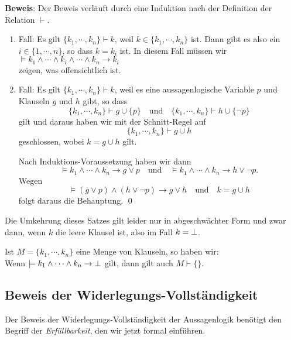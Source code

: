 \noindent
\textbf{Beweis}:  Der Beweis verl\"{a}uft durch eine Induktion nach der Definition der Relation $\vdash$. 
\begin{enumerate}
\item Fall: Es gilt $\{ k_1, \cdots, k_n \} \vdash k$, weil $k \in \{ k_1, \cdots, k_n \}$ ist.  
      Dann gibt es also ein $i \in \{1,\cdots,n\}$, so dass $k = k_i$ ist.  In diesem Fall
      m\"{u}ssen wir
      \\[0.2cm]
      \hspace*{1.3cm}
      $\models k_1 \wedge \cdots \wedge k_i \wedge \cdots \wedge k_n \rightarrow k_i$
      \\[0.2cm]
      zeigen, was offensichtlich ist.
\item Fall: Es gilt $\{ k_1, \cdots, k_n \} \vdash k$, weil es eine aussagenlogische
      Variable $p$ und Klauseln $g$ und $h$ gibt, so dass 
      \[ \{ k_1, \cdots, k_n \} \vdash g \cup \{ p \} \quad \mathrm{und} \quad
         \{ k_1, \cdots, k_n \} \vdash h \cup \{ \neg p \}
      \]
      gilt und daraus haben wir mit der Schnitt-Regel auf
      \[ \{ k_1, \cdots, k_n \} \vdash g \cup h \]
      geschlossen, wobei $k = g \cup h$ gilt. 

      Nach Induktions-Voraussetzung haben wir dann
      \[ \models k_1 \wedge \cdots \wedge k_n \rightarrow g \vee p \quad \mathrm{und} \quad 
         \models k_1 \wedge \cdots \wedge k_n \rightarrow h \vee \neg p. \]
      Wegen 
      \[ \models (g \vee p) \wedge (h \vee \neg p) \rightarrow g \vee h \quad \mathrm{und} \quad
         k = g \cup h \]
      folgt daraus die Behauptung.
      \qed
\end{enumerate}

\noindent
Die Umkehrung dieses Satzes gilt leider nur in abgeschw\"{a}chter Form und zwar dann, wenn $k$
die leere Klausel ist, also im Fall $k = \bot$.
\begin{Satz} \label{widerlegungs-vollstaendig}
  Ist  $M = \{k_1, \cdots, k_n \}$ eine Menge von Klauseln,
  so haben wir: \\[0.1cm]
  \hspace*{1.3cm} 
  Wenn $\models k_1 \wedge \cdots \wedge k_n \rightarrow \bot$ gilt, dann gilt auch  $M \vdash \{\}$.
\end{Satz}
\vspace*{0.2cm}



\subsection{Beweis der Widerlegungs-Vollst\"{a}ndigkeit}
Der Beweis der Widerlegungs-Vollst\"{a}ndigkeit der Aussagenlogik ben\"{o}tigt den  Begriff der
\emph{\color{blue}Erf\"{u}llbarkeit}, den wir jetzt formal einf\"{u}hren. 

